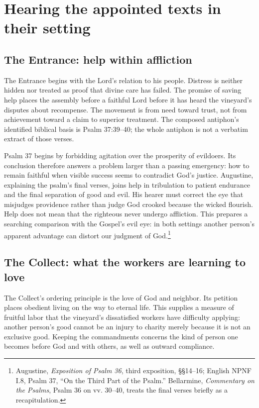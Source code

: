 \section{Hearing the appointed texts in their setting}
\subsection{The Entrance: help within affliction}
The Entrance begins with the Lord's relation to his people. Distress is neither hidden nor treated as proof that divine care has failed. The promise of saving help places the assembly before a faithful Lord before it has heard the vineyard's disputes about recompense. The movement is from need toward trust, not from achievement toward a claim to superior treatment. The composed antiphon's identified biblical basis is Psalm 37:39--40; the whole antiphon is not a verbatim extract of those verses.

Psalm 37 begins by forbidding agitation over the prosperity of evildoers. Its conclusion therefore answers a problem larger than a passing emergency: how to remain faithful when visible success seems to contradict God's justice. Augustine, explaining the psalm's final verses, joins help in tribulation to patient endurance and the final separation of good and evil. His hearer must correct the eye that misjudges providence rather than judge God crooked because the wicked flourish. Help does not mean that the righteous never undergo affliction. This prepares a searching comparison with the Gospel's evil eye: in both settings another person's apparent advantage can distort our judgment of God.\footnote{Augustine, \textit{Exposition of Psalm 36}, third exposition, §§14--16; English NPNF I.8, Psalm 37, ``On the Third Part of the Psalm.'' Bellarmine, \textit{Commentary on the Psalms}, Psalm 36 on vv. 30--40, treats the final verses briefly as a recapitulation.}

\subsection{The Collect: what the workers are learning to love}
The Collect's ordering principle is the love of God and neighbor. Its petition places obedient living on the way to eternal life. This supplies a measure of fruitful labor that the vineyard's dissatisfied workers have difficulty applying: another person's good cannot be an injury to charity merely because it is not an exclusive good. Keeping the commandments concerns the kind of person one becomes before God and with others, as well as outward compliance.


